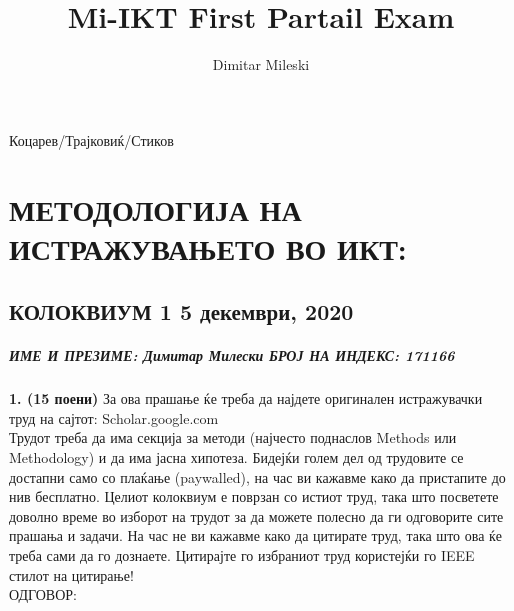 \documentclass[11pt]{article}
\title{Mi-IKT First Partail Exam}
\author{Dimitar Mileski}
\begin{document}
    
    \maketitle
    
    

    
    Коцарев/Трајковиќ/Стиков

\hypertarget{ux43cux435ux442ux43eux434ux43eux43bux43eux433ux438ux458ux430-ux43dux430-ux438ux441ux442ux440ux430ux436ux443ux432ux430ux45aux435ux442ux43e-ux432ux43e-ux438ux43aux442}{%
\section{МЕТОДОЛОГИЈА НА ИСТРАЖУВАЊЕТО ВО
ИКТ:}\label{ux43cux435ux442ux43eux434ux43eux43bux43eux433ux438ux458ux430-ux43dux430-ux438ux441ux442ux440ux430ux436ux443ux432ux430ux45aux435ux442ux43e-ux432ux43e-ux438ux43aux442}}

\hypertarget{ux43aux43eux43bux43eux43aux432ux438ux443ux43c-1-5-ux434ux435ux43aux435ux43cux432ux440ux438-2020}{%
\subsection{КОЛОКВИУМ 1 5 декември,
2020}\label{ux43aux43eux43bux43eux43aux432ux438ux443ux43c-1-5-ux434ux435ux43aux435ux43cux432ux440ux438-2020}}

\hypertarget{ux438ux43cux435-ux438-ux43fux440ux435ux437ux438ux43cux435-ux434ux438ux43cux438ux442ux430ux440-ux43cux438ux43bux435ux441ux43aux438-ux431ux440ux43eux458-ux43dux430-ux438ux43dux434ux435ux43aux441-171166}{%
\subparagraph{ИМЕ И ПРЕЗИМЕ: Димитар Милески БРОЈ НА ИНДЕКС:
171166}\label{ux438ux43cux435-ux438-ux43fux440ux435ux437ux438ux43cux435-ux434ux438ux43cux438ux442ux430ux440-ux43cux438ux43bux435ux441ux43aux438-ux431ux440ux43eux458-ux43dux430-ux438ux43dux434ux435ux43aux441-171166}}

    \textbf{1. (15 поени)} За ова прашање ќе треба да најдете оригинален
истражувачки труд на сајтот: Scholar.google.com\\
Трудот треба да има секција за методи (најчесто поднаслов Methods или
Methodology) и да има јасна хипотеза. Бидејќи голем дел од трудовите се
достапни само со плаќање (paywalled), на час ви кажавме како да
пристапите до нив бесплатно. Целиот колоквиум е поврзан со истиот труд,
така што посветете доволно време во изборот на трудот за да можете
полесно да ги одговорите сите прашања и задачи. На час не ви кажавме
како да цитирате труд, така што ова ќе треба сами да го дознаете.
Цитирајте го избраниот труд користејќи го IEEE стилот на цитирање!\\
ОДГОВОР: \cite{durall2019unmasking}
\end{document}

